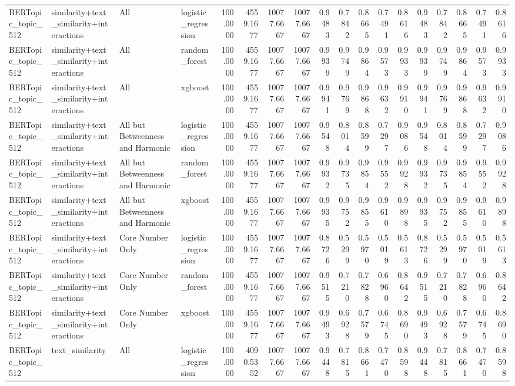 \begin{tabular}{llllrrrrrrrrrrrrrr}
BERTopic_topic_512 & similarity+text_similarity+interactions & All & logistic_regression & 100.0000 & 4559.1677 & 10077.6667 & 10077.6667 & 0.9483 & 0.7842 & 0.8665 & 0.7491 & 0.8616 & 0.9483 & 0.7842 & 0.8665 & 0.7491 & 0.8616 \\
BERTopic_topic_512 & similarity+text_similarity+interactions & All & random_forest & 100.0000 & 4559.1677 & 10077.6667 & 10077.6667 & 0.9939 & 0.9749 & 0.9864 & 0.9573 & 0.9933 & 0.9939 & 0.9749 & 0.9864 & 0.9573 & 0.9933 \\
BERTopic_topic_512 & similarity+text_similarity+interactions & All & xgboost & 100.0000 & 4559.1677 & 10077.6667 & 10077.6667 & 0.9941 & 0.9769 & 0.9868 & 0.9632 & 0.9910 & 0.9941 & 0.9769 & 0.9868 & 0.9632 & 0.9910 \\
BERTopic_topic_512 & similarity+text_similarity+interactions & All but Betweenness and Harmonic & logistic_regression & 100.0000 & 4559.1677 & 10077.6667 & 10077.6667 & 0.9548 & 0.8014 & 0.8599 & 0.7297 & 0.9086 & 0.9548 & 0.8014 & 0.8599 & 0.7297 & 0.9086 \\
BERTopic_topic_512 & similarity+text_similarity+interactions & All but Betweenness and Harmonic & random_forest & 100.0000 & 4559.1677 & 10077.6667 & 10077.6667 & 0.9932 & 0.9735 & 0.9854 & 0.9552 & 0.9928 & 0.9932 & 0.9735 & 0.9854 & 0.9552 & 0.9928 \\
BERTopic_topic_512 & similarity+text_similarity+interactions & All but Betweenness and Harmonic & xgboost & 100.0000 & 4559.1677 & 10077.6667 & 10077.6667 & 0.9935 & 0.9752 & 0.9855 & 0.9610 & 0.9898 & 0.9935 & 0.9752 & 0.9855 & 0.9610 & 0.9898 \\
BERTopic_topic_512 & similarity+text_similarity+interactions & Core Number Only & logistic_regression & 100.0000 & 4559.1677 & 10077.6667 & 10077.6667 & 0.8726 & 0.5299 & 0.5970 & 0.5019 & 0.5613 & 0.8726 & 0.5299 & 0.5970 & 0.5019 & 0.5613 \\
BERTopic_topic_512 & similarity+text_similarity+interactions & Core Number Only & random_forest & 100.0000 & 4559.1677 & 10077.6667 & 10077.6667 & 0.9515 & 0.7210 & 0.7828 & 0.6960 & 0.8642 & 0.9515 & 0.7210 & 0.7828 & 0.6960 & 0.8642 \\
BERTopic_topic_512 & similarity+text_similarity+interactions & Core Number Only & xgboost & 100.0000 & 4559.1677 & 10077.6667 & 10077.6667 & 0.9493 & 0.6928 & 0.7579 & 0.6745 & 0.8690 & 0.9493 & 0.6928 & 0.7579 & 0.6745 & 0.8690 \\
BERTopic_topic_512 & text_similarity & All & logistic_regression & 100.0000 & 4090.5352 & 10077.6667 & 10077.6667 & 0.9448 & 0.7815 & 0.8661 & 0.7470 & 0.8598 & 0.9448 & 0.7815 & 0.8661 & 0.7470 & 0.8598 \\

\end{tabular}
